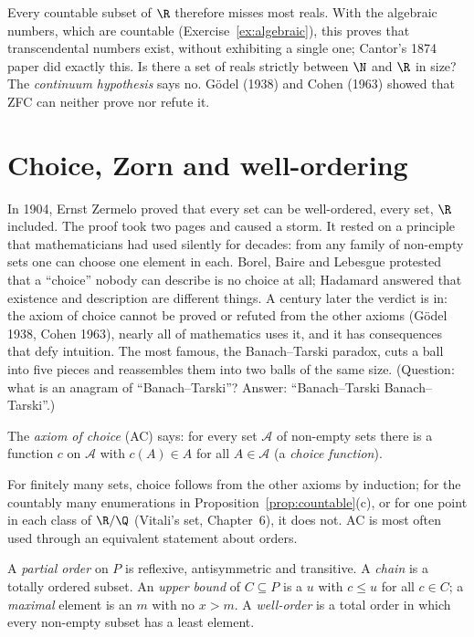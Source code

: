 Every countable subset of $\R$ therefore misses most reals. With the algebraic numbers, which are countable
(Exercise~\ref{ex:algebraic}), this proves that transcendental numbers exist, without exhibiting a single one; Cantor's
1874 paper did exactly this. Is there a set of reals strictly between $\N$ and $\R$ in size? The \emph{continuum
hypothesis} says no. G\"odel (1938) and Cohen (1963) showed that ZFC can neither prove nor refute it.

\section{Choice, Zorn and well-ordering}\label{sec:choice}

In 1904, Ernst Zermelo proved that every set can be well-ordered, every set, $\R$ included. The proof took two pages
and caused a storm. It rested on a principle that mathematicians had used silently for decades: from any family of
non-empty sets one can choose one element in each. Borel, Baire and Lebesgue protested that a ``choice'' nobody can
describe is no choice at all; Hadamard answered that existence and description are different things. A century later
the verdict is in: the axiom of choice cannot be proved or refuted from the other axioms (G\"odel 1938, Cohen 1963),
nearly all of mathematics uses it, and it has consequences that defy intuition. The most famous, the Banach--Tarski
paradox, cuts a ball into five pieces and reassembles them into two balls of the same size. (Question: what is an
anagram of ``Banach--Tarski''? Answer: ``Banach--Tarski Banach--Tarski''.)

\begin{definition}
The \emph{axiom of choice} (AC) says: for every set $\mathcal A$ of non-empty sets there is a function $c$ on $\mathcal A$ with $c(A)\in A$ for all
$A\in\mathcal A$ (a \emph{choice function}).
\end{definition}

For finitely many sets, choice follows from the other axioms by induction; for the countably many enumerations in
Proposition~\ref{prop:countable}(c), or for one point in each class of $\R/\Q$ (Vitali's set, Chapter~6), it does not. AC is most
often used through an equivalent statement about orders.

\begin{definition}
A \emph{partial order} on $P$ is reflexive, antisymmetric and transitive. A \emph{chain} is a totally ordered subset. An \emph{upper bound} of
$C\subseteq P$ is a $u$ with $c\le u$ for all $c\in C$; a \emph{maximal} element is an $m$ with no $x>m$. A \emph{well-order} is a total order in which every
non-empty subset has a least element.
\end{definition}

